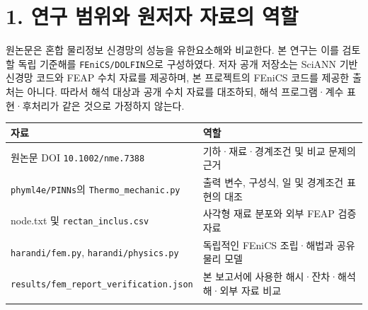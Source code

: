 \documentclass[10pt,a4paper]{article}
\begin{document}
\tableofcontents\thispagestyle{fancy}

\clearpage

\section{1. 연구 범위와 원저자 자료의 역할}

원논문은 혼합 물리정보 신경망의 성능을 유한요소해와 비교한다. 본 연구는 이를 검토할 독립 기준해를 \nolinkurl{FEniCS/DOLFIN}으로 구성하였다. 저자 공개 저장소는 SciANN 기반 신경망 코드와 FEAP 수치 자료를 제공하며, 본 프로젝트의 FEniCS 코드를 제공한 출처는 아니다. 따라서 해석 대상과 공개 수치 자료를 대조하되, 해석 프로그램·계수 표현·후처리가 같은 것으로 가정하지 않는다.\par

\begingroup\small

\par\begin{minipage}{\linewidth}\begin{tabular}{>{\raggedright\arraybackslash}p{}>{\raggedright\arraybackslash}p{}}

\rowcolor{tint} \textbf{자료} & \textbf{역할}\\\midrule

원논문 DOI \nolinkurl{10.1002/nme.7388} & 기하·재료·경계조건 및 비교 문제의 근거\\\addlinespace[2pt]

\nolinkurl{phyml4e/PINNs}의 \nolinkurl{Thermo_mechanic.py} & 출력 변수, 구성식, 일 및 경계조건 표현의 대조\\\addlinespace[2pt]

node.txt 및 \nolinkurl{rectan_inclus.csv} & 사각형 재료 분포와 외부 FEAP 검증 자료\\\addlinespace[2pt]

\nolinkurl{harandi/fem.py}, \nolinkurl{harandi/physics.py} & 독립적인 FEniCS 조립·해법과 공유 물리 모델\\\addlinespace[2pt]

\nolinkurl{results/fem_report_verification.json} & 본 보고서에 사용한 해시·잔차·해석해·외부 자료 비교\\\addlinespace[2pt]

\bottomrule\end{tabular}\end{minipage}\par\vspace{5pt}\endgroup
\end{document}
